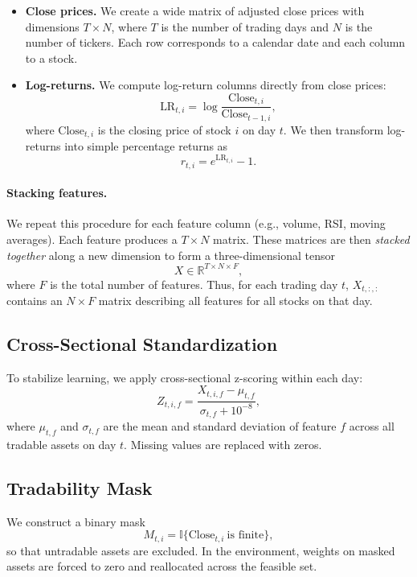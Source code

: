 \documentclass[10pt,leqno]{amsart}
\begin{document}
\begin{itemize}
    \item \textbf{Close prices.} We create a wide matrix of adjusted close prices with dimensions $T \times N$, where $T$ is the number of trading days and $N$ is the number of tickers. Each row corresponds to a calendar date and each column to a stock. 

    \item \textbf{Log-returns.} We compute log-return columns directly from close prices:
    \[
    \text{LR}_{t,i} = \log \frac{\text{Close}_{t,i}}{\text{Close}_{t-1,i}},
    \]
    where $\text{Close}_{t,i}$ is the closing price of stock $i$ on day $t$. We then transform log-returns into simple percentage returns as
    \[
    r_{t,i} = e^{\text{LR}_{t,i}} - 1.
    \]
\end{itemize}

\paragraph{Stacking features.}
We repeat this procedure for each feature column (e.g., volume, RSI, moving averages). Each feature produces a $T \times N$ matrix. These matrices are then \emph{stacked together} along a new dimension to form a three-dimensional tensor
\[
X \in \mathbb{R}^{T \times N \times F},
\]
where $F$ is the total number of features. Thus, for each trading day $t$, $X_{t,:,:}$ contains an $N \times F$ matrix describing all features for all stocks on that day.


\subsection{Cross-Sectional Standardization}
To stabilize learning, we apply cross-sectional z-scoring within each day:
\[
Z_{t,i,f} = \frac{X_{t,i,f} - \mu_{t,f}}{\sigma_{t,f} + 10^{-8}},
\]
where $\mu_{t,f}$ and $\sigma_{t,f}$ are the mean and standard deviation of feature $f$ across all tradable assets on day $t$. Missing values are replaced with zeros.

\subsection{Tradability Mask}
We construct a binary mask
\[
M_{t,i} = \mathbb{I}\{\text{Close}_{t,i}\ \text{is finite}\},
\]
so that untradable assets are excluded. In the environment, weights on masked assets are forced to zero and reallocated across the feasible set.
\end{document}
